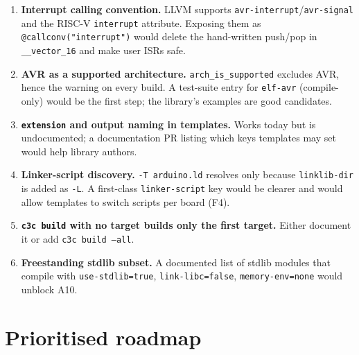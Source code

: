 \documentclass[11pt,a4paper]{article}
\newcommand{\pkg}[1]{\texttt{#1}}
\begin{document}
\begin{enumerate}
  \item \textbf{Interrupt calling convention.} LLVM supports \pkg{avr-interrupt}/\pkg{avr-signal}
        and the RISC-V \pkg{interrupt} attribute. Exposing them as
        \pkg{@callconv("interrupt")} would delete the hand-written push/pop in \pkg{\_\_vector\_16}
        and make user ISRs safe.
  \item \textbf{AVR as a supported architecture.} \pkg{arch\_is\_supported} excludes AVR, hence the
        warning on every build. A test-suite entry for \pkg{elf-avr} (compile-only) would be the
        first step; the library's examples are good candidates.
  \item \textbf{\pkg{extension} and output naming in templates.} Works today but is undocumented;
        a documentation PR listing which keys templates may set would help library authors.
  \item \textbf{Linker-script discovery.} \pkg{-T arduino.ld} resolves only because \pkg{linklib-dir}
        is added as \pkg{-L}. A first-class \pkg{linker-script} key would be clearer and
        would allow templates to switch scripts per board (F4).
  \item \textbf{\pkg{c3c build} with no target builds only the first target.} Either document it or
        add \pkg{c3c build --all}.
  \item \textbf{Freestanding stdlib subset.} A documented list of stdlib modules that compile
        with \pkg{use-stdlib=true}, \pkg{link-libc=false}, \pkg{memory-env=none} would unblock A10.
\end{enumerate}

\section{Prioritised roadmap}
\end{document}
